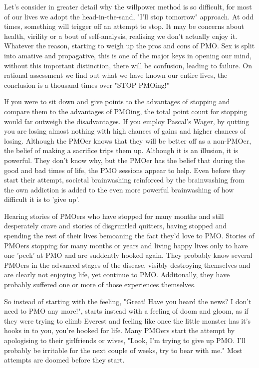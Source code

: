 Let's consider in greater detail why the willpower method is so difficult, for most of our lives we adopt the head-in-the-sand, "I'll stop tomorrow" approach. At odd times, something will trigger off an attempt to stop. It may be concerns about health, virility or a bout of self-analysis, realising we don't actually enjoy it. Whatever the reason, starting to weigh up the pros and cons of PMO. Sex is split into amative and propagative, this is one of the major keys in opening our mind, without this important distinction, there will be confusion, leading to failure. On rational assessment we find out what we have known our entire lives, the conclusion is a thousand times over "STOP PMOing!"

If you were to sit down and give points to the advantages of stopping and compare them to the advantages of PMOing, the total point count for stopping would far outweigh the disadvantages. If you employ Pascal's Wager, by qutting you are losing almost nothing with high chances of gains and higher chances of  losing. Although the PMOer knows that they will be better off as a non-PMOer, the belief of making a sacrifice trips them up. Although it is an illusion, it is powerful. They don't know why, but the PMOer has the belief that during the good and bad times of life, the PMO sessions appear to help. Even before they start their attempt, societal brainwashing reinforced by the brainwashing from the own addiction is added to the even more powerful brainwashing of how difficult it is to 'give up'.

Hearing stories of PMOers who have stopped for many months and still desperately crave and stories of disgruntled quitters, having stopped and spending the rest of their lives bemoaning the fact they'd love to PMO. Stories of PMOers stopping for many months or years and living happy lives only to have one 'peek' at PMO and are suddently hooked again. They probably know several PMOers in the advanced stages of the disease, visibly destroying themselves and are clearly not enjoying life, yet continue to PMO. Additonally, they have probably suffered one or more of those experiences themselves.

So instead of starting with the feeling, "Great! Have you heard the news? I don't need to PMO any more!", starts instead with a feeling of doom and gloom, as if they were trying to climb Everest and feeling like once the little monster has it's hooks in to you, you're hooked for life. Many PMOers start the attempt by apologising to their girlfriends or wives, "Look, I'm trying to give up PMO. I'll probably be irritable for the next couple of weeks, try to bear with me." Most attempts are doomed before they start.

